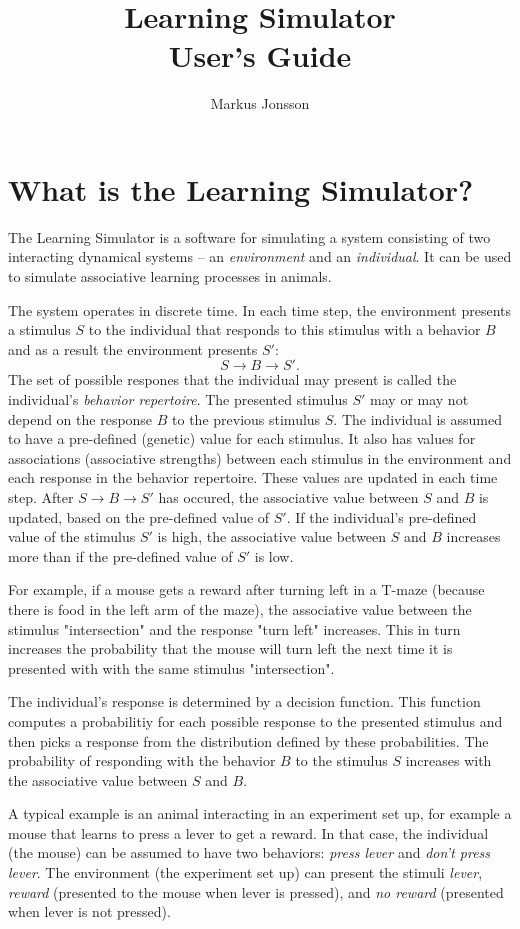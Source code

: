\documentclass[11pt]{article}
\title{Learning Simulator \\ User's Guide}
\author{Markus Jonsson}
\begin{document}
\maketitle

\section{What is the Learning Simulator?}
The Learning Simulator is a software for simulating a system consisting of
two interacting dynamical systems -- an \emph{environment} and an \emph{individual}.
It can be used to simulate associative learning processes in animals.

The system operates in discrete time. In each time step,
the environment presents a stimulus $S$ to the individual that responds
to this stimulus with a behavior $B$ and as a result the environment
presents $S'$:
\[
S \to B \to S'.
\]
The set of possible respones that the individual may present is called the
individual's \emph{behavior repertoire}.
The presented stimulus $S'$ may or may not
depend on the response $B$ to the previous stimulus $S$.
The individual is assumed to have a pre-defined (genetic) value for each stimulus. It also has values for associations (associative strengths) between each stimulus in the
environment and each response in the behavior repertoire. These values are updated in each time step.
After $S \to B \to S'$ has occured, the associative value between $S$ and $B$ is
updated, based on the pre-defined value of $S'$. If the individual's pre-defined
value of the stimulus $S'$ is high, the associative value between $S$ and $B$
increases more than if the pre-defined value of $S'$ is low.

For example, if a mouse gets a reward after turning left in a T-maze (because there
is food in the left arm of the maze), the associative value
between the stimulus "intersection" and the response "turn left" increases.
This in turn increases the probability that the mouse will turn left the next time
it is presented with with the same stimulus "intersection".

The individual's response is determined by a decision function.
This function computes a probabilitiy for each possible response to the
presented stimulus and then picks a response from the distribution defined by
these probabilities. The probability of responding with the behavior $B$ to the stimulus 
$S$ increases with the associative value between $S$ and $B$.

A typical example is an animal interacting in an experiment set up, for example
a mouse that learns to press a lever to get a reward. In that case, the individual
(the mouse) can be assumed to have two behaviors: \emph{press lever} and \emph{don't press lever}. The environment (the experiment set up) can present the stimuli \emph{lever}, \emph{reward} (presented to the mouse when lever is pressed), and \emph{no reward} (presented when lever is not pressed).
\end{document}
